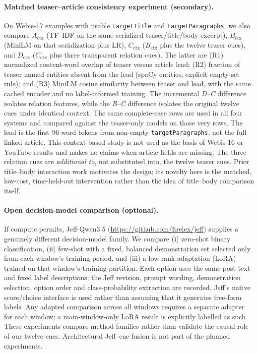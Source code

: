 \documentclass[11pt]{article}
\begin{document}
\paragraph{Matched teaser--article consistency experiment (secondary).} On Webis-17 examples with usable \texttt{targetTitle} and \texttt{targetParagraphs}, we also compare $A_{\mathrm{ctx}}$ (TF--IDF on the same serialized teaser/title/body excerpt), $B_{\mathrm{ctx}}$ (MiniLM on that serialization plus LR), $C_{\mathrm{ctx}}$ ($B_{\mathrm{ctx}}$ plus the twelve teaser cues), and $D_{\mathrm{ctx}}$ ($C_{\mathrm{ctx}}$ plus three transparent relation cues). The latter are (R1) normalized content-word overlap of teaser versus article lead; (R2) fraction of teaser named entities absent from the lead (spaCy entities, explicit empty-set rule); and (R3) MiniLM cosine similarity between teaser and lead, with the same cached encoder and no label-informed training. The incremental \emph{D--C} difference isolates relation features, while the \emph{B--C} difference isolates the original twelve cues under identical context. The same complete-case rows are used in all four systems and compared against the teaser-only models on those very rows. The lead is the first 96 word tokens from non-empty \texttt{targetParagraphs}, not the full linked article. This context-based study is not used as the basis of Webis-16 or YouTube results and makes no claims when article fields are missing. The three relation cues are \emph{additional to}, not substituted into, the twelve teaser cues. Prior title--body interaction work \cite{wu2020} motivates the design; its novelty here is the matched, low-cost, time-held-out intervention rather than the idea of title--body comparison itself.

\paragraph{Open decision-model comparison (optional).} If compute permits, Jeff-Qwen3.5 (\url{https://github.com/firelex/jeff}) supplies a genuinely different decision-model family. We compare (i) zero-shot binary classification, (ii) few-shot with a fixed, balanced demonstration set selected only from each window's training period, and (iii) a low-rank adaptation (LoRA) trained on that window's training partition. Each option uses the same post text and fixed label descriptions; the Jeff revision, prompt wording, demonstration selection, option order and class-probability extraction are recorded. Jeff's native score/choice interface is used rather than assuming that it generates free-form labels. Any adapted comparison across all windows requires a separate adapter for each window; a main-window-only LoRA result is explicitly labelled as such. These experiments compare method families rather than validate the causal role of our twelve cues. Architectural Jeff--cue fusion is not part of the planned experiments.
\end{document}
